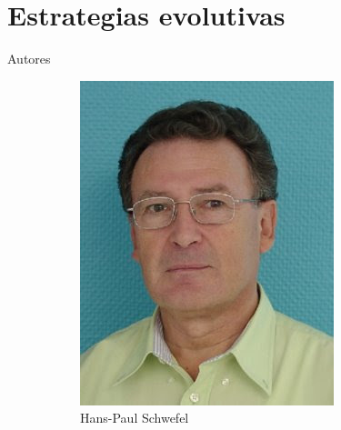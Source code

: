 \documentclass[10pt]{beamer}
\begin{document}
\section{Estrategias evolutivas}

\begin{frame}[fragile]{Autores}

  \begin{figure}[htp]
    \begin{subfigure}[b]{.3\textwidth}
      \includegraphics[width=.95\textwidth]{imgs/schwefel.jpg}
      \caption*{Hans-Paul Schwefel}
    \end{subfigure}%
    \begin{subfigure}[b]{.3\textwidth}

\end{subfigure}
\end{figure}
\end{frame}
\end{document}
